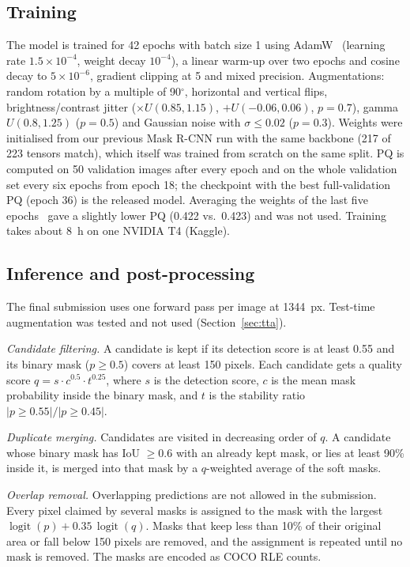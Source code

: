 \documentclass[sigconf]{acmart}
\begin{document}
\subsection{Training}
    The model is trained for 42 epochs with batch size 1 using AdamW~\cite{loshchilov2019adamw} (learning rate $1.5\times10^{-4}$, weight decay $10^{-4}$), a linear warm-up over two epochs and cosine decay to $5\times10^{-6}$, gradient clipping at 5 and mixed precision. Augmentations: random rotation by a multiple of 90$^\circ$, horizontal and vertical flips, brightness/contrast jitter ($\times U(0.85,1.15)$, $+U(-0.06,0.06)$, $p=0.7$), gamma $U(0.8,1.25)$ ($p=0.5$) and Gaussian noise with $\sigma\le0.02$ ($p=0.3$). Weights were initialised from our previous Mask R-CNN run with the same backbone (217 of 223 tensors match), which itself was trained from scratch on the same split. PQ is computed on 50 validation images after every epoch and on the whole validation set every six epochs from epoch 18; the checkpoint with the best full-validation PQ (epoch 36) is the released model. Averaging the weights of the last five epochs~\cite{izmailov2018swa} gave a slightly lower PQ (0.422 vs.\ 0.423) and was not used. Training takes about 8~h on one NVIDIA T4 (Kaggle).

\subsection{Inference and post-processing}
    The final submission uses one forward pass per image at 1344~px. Test-time augmentation was tested and not used (Section~\ref{sec:tta}).

    \textit{Candidate filtering.} A candidate is kept if its detection score is at least 0.55 and its binary mask ($p\ge0.5$) covers at least 150 pixels. Each candidate gets a quality score $q = s \cdot c^{0.5} \cdot t^{0.25}$, where $s$ is the detection score, $c$ is the mean mask probability inside the binary mask, and $t$ is the stability ratio $|p\ge0.55|/|p\ge0.45|$.

    \textit{Duplicate merging.} Candidates are visited in decreasing order of $q$. A candidate whose binary mask has IoU $\ge0.6$ with an already kept mask, or lies at least 90\% inside it, is merged into that mask by a $q$-weighted average of the soft masks.

    \textit{Overlap removal.} Overlapping predictions are not allowed in the submission. Every pixel claimed by several masks is assigned to the mask with the largest $\operatorname{logit}(p) + 0.35\,\operatorname{logit}(q)$. Masks that keep less than 10\% of their original area or fall below 150 pixels are removed, and the assignment is repeated until no mask is removed. The masks are encoded as COCO RLE counts.
\end{document}
